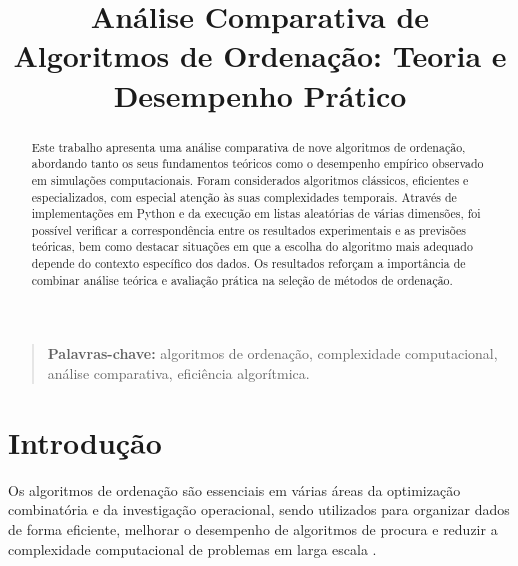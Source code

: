 \documentclass[conference]{IEEEtran}
\begin{document}
\title{Análise Comparativa de Algoritmos de Ordenação: Teoria e Desempenho Prático}

\author{
\and
{}
}

\maketitle
\thispagestyle{plain}

\begin{abstract}
Este trabalho apresenta uma análise comparativa de nove algoritmos de ordenação, abordando tanto os seus fundamentos teóricos como o desempenho empírico observado em simulações computacionais. Foram considerados algoritmos clássicos, eficientes e especializados, com especial atenção às suas complexidades temporais. Através de implementações em Python e da execução em listas aleatórias de várias dimensões, foi possível verificar a correspondência entre os resultados experimentais e as previsões teóricas, bem como destacar situações em que a escolha do algoritmo mais adequado depende do contexto específico dos dados. Os resultados reforçam a importância de combinar análise teórica e avaliação prática na seleção de métodos de ordenação.
\end{abstract}

\begin{quote}
\small
\noindent
\textbf{Palavras-chave:} algoritmos de ordenação, complexidade computacional, análise comparativa, eficiência algorítmica.
\end{quote}

\IEEEpeerreviewmaketitle

\section{Introdução}

Os algoritmos de ordenação são essenciais em várias áreas da optimização combinatória e da investigação operacional, sendo utilizados para organizar dados de forma eficiente, melhorar o desempenho de algoritmos de procura e reduzir a complexidade computacional de problemas em larga escala \cite{intro1}.
\end{document}

